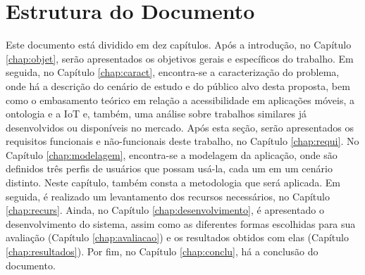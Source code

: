 \section{Estrutura do Documento}
Este documento está dividido em dez capítulos. Após a introdução, no Capítulo \ref{chap:objet}, serão apresentados os objetivos gerais e específicos do trabalho. Em seguida, no Capítulo \ref{chap:caract}, encontra-se a caracterização do problema, onde há a descrição do cenário de estudo e do público alvo desta proposta, bem como o embasamento teórico em relação a acessibilidade em aplicações móveis, a ontologia e a IoT e, também, uma análise sobre trabalhos similares já desenvolvidos ou disponíveis no mercado. Após esta seção, serão apresentados os requisitos funcionais e não-funcionais deste trabalho, no Capítulo \ref{chap:requi}. No Capítulo \ref{chap:modelagem}, encontra-se a modelagem da aplicação, onde são definidos três perfis de usuários que possam usá-la, cada um em um cenário distinto. Neste capítulo, também consta a metodologia que será aplicada. Em seguida, é realizado um levantamento dos recursos necessários, no Capítulo \ref{chap:recurs}. Ainda, no Capítulo \ref{chap:desenvolvimento}, é apresentado o desenvolvimento do sistema, assim como as diferentes formas escolhidas para sua avaliação (Capítulo \ref{chap:avaliacao}) e os resultados obtidos com elas (Capítulo \ref{chap:resultados}). Por fim, no Capítulo \ref{chap:conclu}, há a conclusão do documento.